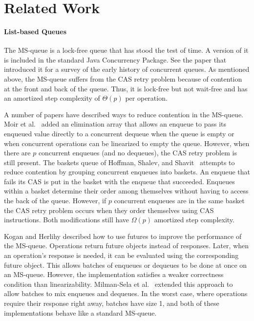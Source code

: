 
\section{Related Work}

\paragraph{List-based Queues}
The MS-queue \cite{MS98} is a lock-free queue that has stood the test of time.
A version of it is
included in the standard Java Concurrency Package.  %
See the paper that introduced it for a survey of the early history of concurrent queues.
As mentioned above, the MS-queue suffers from the CAS retry problem because of contention at the front and back of the queue.
Thus, it is lock-free but not wait-free and has an amortized step complexity
of $\Theta(p)$ per operation.

A number of papers have described ways to reduce contention in the MS-queue.
Moir et al.~\cite{DBLP:conf/spaa/MoirNSS05} 
added an elimination array that allows an enqueue to pass its enqueued value directly
to a concurrent dequeue when the queue is empty or when concurrent operations 
can be linearized to empty the queue.
However, when there are $p$ concurrent enqueues (and no dequeues), the CAS retry problem
is still present.
The baskets queue of
Hoffman, Shalev, and Shavit~\cite{DBLP:conf/opodis/HoffmanSS07} 
attempts to reduce contention by grouping concurrent enqueues into baskets.
An enqueue that fails its CAS is put in the basket with the enqueue that succeeded.
Enqueues within a basket determine their order among themselves without having to access the back of the queue.
However, if $p$ concurrent enqueues are in the same basket
the CAS retry problem occurs when they order themselves using CAS instructions.
Both modifications still have $\Omega(p)$ amortized step complexity.

Kogan and Herlihy \cite{DBLP:conf/podc/KoganH14} described how to use futures to improve
the performance of the MS-queue.
Operations return future
objects instead of responses. Later, when an operation's response is needed, it
can be evaluated using the corresponding future object.
This allows batches of enqueues or dequeues to be done at once on an MS-queue.
However, the implementation satisfies a weaker correctness condition than linearizability.
Milman-Sela et al.~\cite{MKLLP22} extended this approach to allow batches
to mix enqueues and dequeues.
In the worst case, where operations require their response right away,
batches have size 1, and both of these implementations behave like a standard MS-queue.

